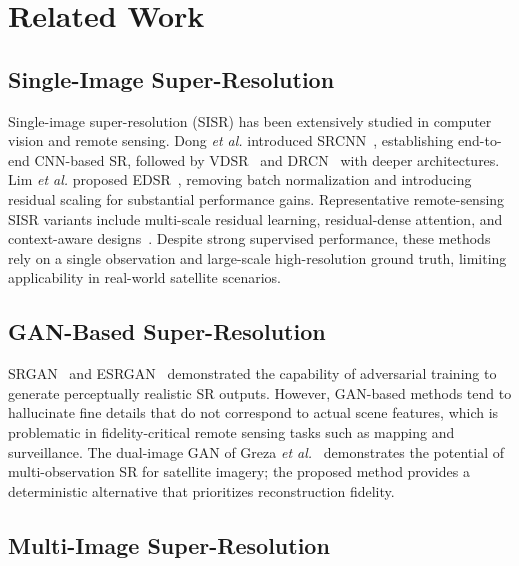 \documentclass[conference]{IEEEtran}
\begin{document}
\section{Related Work}

\subsection{Single-Image Super-Resolution}

Single-image super-resolution (SISR) has been extensively studied in computer vision and remote sensing. Dong \textit{et al.} introduced SRCNN~\cite{dong2014srcnn}, establishing end-to-end CNN-based SR, followed by VDSR~\cite{kim2016vdsr} and DRCN~\cite{kim2016drcn} with deeper architectures. Lim \textit{et al.} proposed EDSR~\cite{lim2017edsr}, removing batch normalization and introducing residual scaling for substantial performance gains. Representative remote-sensing SISR variants include multi-scale residual learning, residual-dense attention, and context-aware designs~\cite{huan2021msrn, yu2022rdhan, peng2023context}. Despite strong supervised performance, these methods rely on a single observation and large-scale high-resolution ground truth, limiting applicability in real-world satellite scenarios.

\subsection{GAN-Based Super-Resolution}

SRGAN~\cite{ledig2017srgan} and ESRGAN~\cite{wang2018esrgan} demonstrated the capability of adversarial training to generate perceptually realistic SR outputs. However, GAN-based methods tend to hallucinate fine details that do not correspond to actual scene features, which is problematic in fidelity-critical remote sensing tasks such as mapping and surveillance. The dual-image GAN of Greza \textit{et al.}~\cite{greza2024gan} demonstrates the potential of multi-observation SR for satellite imagery; the proposed method provides a deterministic alternative that prioritizes reconstruction fidelity.

\subsection{Multi-Image Super-Resolution}
\end{document}
